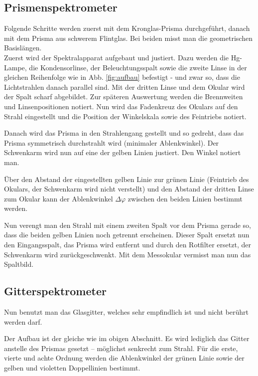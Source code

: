\documentclass[12pt,a4paper,titlepage,headinclude,bibtotoc]{scrartcl}
\begin{document}
\subsection{Prismenspektrometer}
Folgende Schritte werden zuerst mit dem Kronglas-Prisma durchgeführt, danach mit dem Prisma aus schwerem Flintglas.
Bei beiden misst man die geometrischen Basislängen.\\

Zuerst wird der Spektralapparat aufgebaut und justiert.
Dazu werden die Hg-Lampe, die Kondensorlinse, der Beleuchtungsspalt sowie die zweite Linse in der gleichen Reihenfolge wie in Abb. \ref{fig:aufbau} befestigt - und zwar so, dass die Lichtstrahlen danach parallel sind.
Mit der dritten Linse und dem Okular wird der Spalt scharf abgebildet.
Zur späteren Auswertung werden die Brennweiten und Linsenpositionen notiert.
Nun wird das Fadenkreuz des Okulars auf den Strahl eingestellt und die Position der Winkelskala sowie des Feintriebs notiert.

Danach wird das Prisma in den Strahlengang gestellt und so gedreht, dass das Prisma symmetrisch durchstrahlt wird (minimaler Ablenkwinkel).
Der Schwenkarm wird nun auf eine der gelben Linien justiert.
Den Winkel notiert man.

Über den Abstand der eingestellten gelben Linie zur grünen Linie (Feintrieb des Okulars, der Schwenkarm wird nicht verstellt) und den Abstand der dritten Linse zum Okular kann der Ablenkwinkel $\Delta\varphi$ zwischen den beiden Linien bestimmt werden.

Nun verengt man den Strahl mit einem zweiten Spalt vor dem Prisma gerade so, dass die beiden gelben Linien noch getrennt erscheinen.
Dieser Spalt ersetzt nun den Eingangsspalt, das Prisma wird entfernt und durch den Rotfilter ersetzt, der Schwenkarm wird zurückgeschwenkt.
Mit dem Messokular vermisst man nun das Spaltbild.

\subsection{Gitterspektrometer}
Nun benutzt man das Glasgitter, welches sehr empfindlich ist und nicht berührt werden darf.

Der Aufbau ist der gleiche wie im obigen Abschnitt.
Es wird lediglich das Gitter anstelle des Prismas gesetzt -- möglichst senkrecht zum Strahl.
Für die erste, vierte und achte Ordnung werden die Ablenkwinkel der grünen Linie sowie der gelben und violetten Doppellinien bestimmt.
\end{document}
